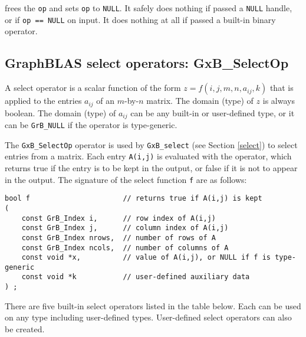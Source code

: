 \documentclass[12pt]{article}
\begin{document}
\noindent
frees the \verb'op' and sets \verb'op' to \verb'NULL'. 
It safely does nothing if passed a \verb'NULL'
handle, or if \verb'op == NULL' on input.
It does nothing at all if passed a built-in binary operator.

\newpage
\subsection{GraphBLAS select operators: {\sf GxB\_SelectOp}} %
\label{selectop}

A select operator is a scalar function of the form $z=f(i,j,m,n,a_{ij},k)$ that
is applied to the entries $a_{ij}$ of an $m$-by-$n$ matrix.  The domain (type)
of $z$ is always boolean.  The domain (type) of $a_{ij}$ can be any built-in or
user-defined type, or it can be \verb'GrB_NULL' if the operator is
type-generic.

The \verb'GxB_SelectOp' operator is used by \verb'GxB_select' (see Section
\ref{select}) to select entries from a matrix.  Each entry \verb'A(i,j)' is
evaluated with the operator, which returns true if the entry is to be kept in
the output, or false if it is not to appear in the output.  The signature of
the select function \verb'f' are as follows:

{\footnotesize
\begin{verbatim}
bool f                      // returns true if A(i,j) is kept
(
    const GrB_Index i,      // row index of A(i,j)
    const GrB_Index j,      // column index of A(i,j)
    const GrB_Index nrows,  // number of rows of A
    const GrB_Index ncols,  // number of columns of A
    const void *x,          // value of A(i,j), or NULL if f is type-generic
    const void *k           // user-defined auxiliary data
) ; \end{verbatim}}

There are five built-in select operators listed in the table below.  Each can
be used on any type including user-defined types.  User-defined select
operators can also be created.
\end{document}
